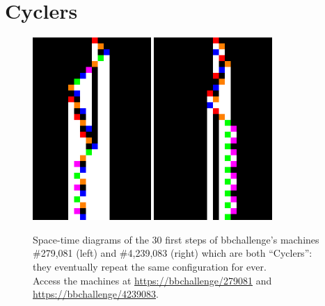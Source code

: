 
\section{Cyclers}\label{sec:cyclers}

\begin{figure}[h!]
  \centering
  \includegraphics[width=0.4\textwidth]{figures/space-time-diagrams/cycler_279081.pdf}
  \hspace{2ex}
  \includegraphics[width=0.4\textwidth]{figures/space-time-diagrams/cycler_4239083.pdf}
  \caption{Space-time diagrams of the 30 first steps of bbchallenge's machines \#279,081 (left) and \#4,239,083 (right) which are both ``Cyclers'': they eventually repeat the same configuration for ever. \\
    Access the machines at \url{https://bbchallenge/279081} and
    \url{https://bbchallenge/4239083}.}\label{fig:cyclers}
\end{figure}

